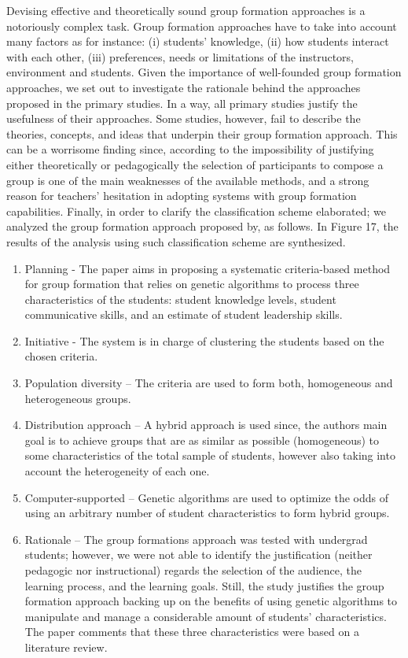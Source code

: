 Devising effective and theoretically sound group formation approaches is a notoriously complex task. Group formation approaches have to take into account many factors as for instance: (i) students’ knowledge, (ii) how students interact with each other, (iii) preferences, needs or limitations of the instructors, environment and students. Given the importance of well-founded group formation approaches, we set out to investigate the rationale behind the approaches proposed in the primary studies. In a way, all primary studies justify the usefulness of their approaches. Some studies, however, fail to describe the theories, concepts, and ideas that underpin their group formation approach. This can be a worrisome finding since, according to the impossibility of justifying either theoretically or pedagogically the selection of participants to compose a group is one of the main weaknesses of the available methods, and a strong reason for teachers’ hesitation in adopting systems with group formation capabilities.
Finally, in order to clarify the classification scheme elaborated; we analyzed the group formation approach proposed by, as follows. In Figure 17, the results of the analysis using such classification scheme are synthesized.

\begin{enumerate}
\item Planning - The paper aims in proposing a systematic criteria-based method for group formation that relies on genetic algorithms to process three characteristics of the students: student knowledge levels, student communicative skills, and an estimate of student leadership skills.
\item Initiative - The system is in charge of clustering the students based on the chosen criteria. 
\item Population diversity – The criteria are used to form both, homogeneous and heterogeneous groups.
\item Distribution approach – A hybrid approach is used since, the authors main goal is to achieve groups that are as similar as possible (homogeneous) to some characteristics of the total sample of students, however also taking into account the heterogeneity of each one. 
\item Computer-supported – Genetic algorithms are used to optimize the odds of using an arbitrary number of student characteristics to form hybrid groups.
\item Rationale – The group formations approach was tested with undergrad students; however, we were not able to identify the justification (neither pedagogic nor instructional) regards the selection of the audience, the learning process, and the learning goals. Still, the study justifies the group formation approach backing up on the benefits of using genetic algorithms to manipulate and manage a considerable amount of students’ characteristics. The paper comments that these three characteristics were based on a literature review.
\end{enumerate}

